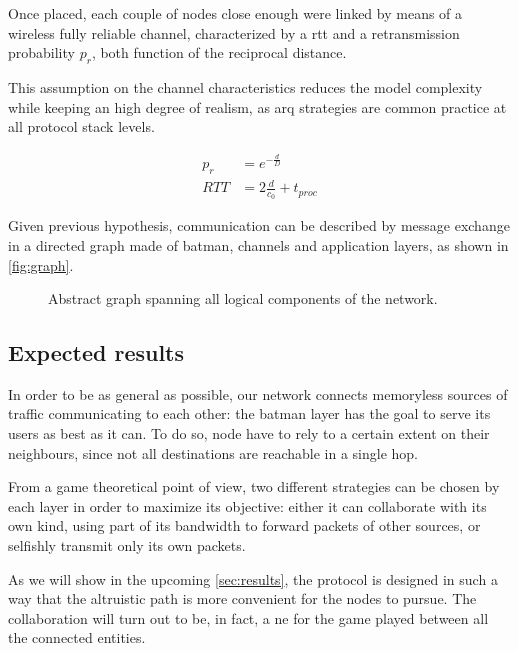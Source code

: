 \documentclass[conference]{IEEEtran}
\begin{document}
Once placed, each couple of nodes close enough were linked by means of a
wireless fully reliable channel, characterized by a \gls{rtt} and a
retransmission probability $p_r$, both function of the reciprocal distance.

This assumption on the channel characteristics reduces the model complexity
while keeping an high degree of realism, as \gls{arq} strategies are common
practice at all protocol stack levels.

\begin{equation}
  \begin{split}
    p_r & = e^{-\frac{d}{D}} \\
    RTT &= 2 \frac{d}{c_0} + t_{proc}
  \end{split}
\end{equation}

Given previous hypothesis, communication can be described by message exchange in
a directed graph made of \gls{batman}, channels and application layers, as shown
in \autoref{fig:graph}.

\begin{figure}[h]
  \centering
  \caption{Abstract graph spanning all logical components of the network.}
  \label{fig:graph}
\end{figure}

\subsection{Expected results}

In order to be as general as possible, our network connects memoryless sources
of traffic communicating to each other: the \gls{batman} layer has the goal to
serve its users as best as it can. To do so, node have to rely to a certain
extent on their neighbours, since not all destinations are reachable in a single
hop.

From a game theoretical point of view, two different strategies can be chosen by
each layer in order to maximize its objective: either it can collaborate with
its own kind, using part of its bandwidth to forward packets of other sources,
or selfishly transmit only its own packets.

As we will show in the upcoming \autoref{sec:results}, the protocol is designed
in such a way that the altruistic path is more convenient for the nodes to
pursue. The collaboration will turn out to be, in fact, a \gls{ne} for the game
played between all the connected entities.
\end{document}
